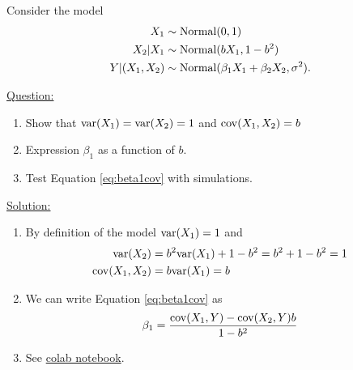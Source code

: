 \begin{example}\label{ex:normal_pred}
Consider the model
\begin{align*}
X_1 &\sim {\rm Normal}(0,1)\\
X_2|X_1 &\sim {\rm Normal}(bX_1,1-b^2)\\
Y|(X_1,X_2) & \sim {\rm Normal}(\beta_1X_1 + \beta_2X_2,\sigma^2). 
\end{align*}


\noindent
\underline{Question:} 
\begin{enumerate}[label=(\alph*)]
\item Show that ${\rm var}(X_1) = {\rm var}(X_2) = 1$ and ${\rm cov}(X_1,X_2)=b$
\item Expression $\beta_1$ as a function of $b$. 
\item Test Equation \ref{eq:beta1cov} with simulations. \\
\end{enumerate}



\noindent
\underline{Solution:} 
\begin{enumerate}[label=(\alph*)]
\item By definition of the model ${\rm var}(X_1)=1$ and 
\begin{align*}
{\rm var}(X_2) &= b^2{\rm var}(X_1) + 1-b^2 = b^2+1-b^2 = 1\\
{\rm cov}(X_1,X_2) &= b{\rm var}(X_1) = b
\end{align*}
\item We can write Equation \ref{eq:beta1cov} as
\begin{equation*}
\beta_1 =  \frac{ {\rm cov}(X_1,Y)- {\rm cov}(X_2,Y)b}{1 -b^2}
\end{equation*}
\item See \href{https://colab.research.google.com/drive/1oIRgP_7-c5DGV1D2iz5nj406mZfJxUIG?usp=sharing}{colab notebook}.
\end{enumerate}


\end{example}

